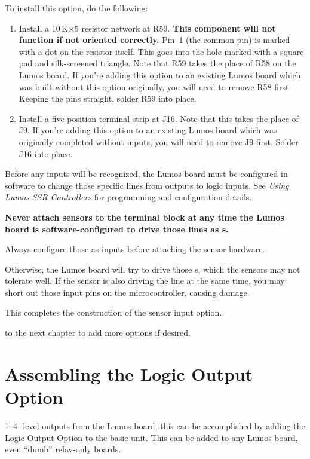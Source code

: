 \documentclass[letterpaper,twoside,onecolumn,openright,final]{memoir}
\begin{document}
To install this option, do the following:
\begin{enumerate}
\item	Install a 10\,K$\times$5 resistor network at R59.  {\bfseries This component will not
	function if not oriented correctly.} Pin~1 (the common pin) is marked with a dot on the 
	resistor itself.  This goes into the hole marked with a square pad and silk-screened 
	triangle.  Note that R59 takes the place of R58 on the Lumos board.  If you're adding this
	option to an existing Lumos board which was built without this option originally, you 
	will need to remove R58 first.  Keeping the pins straight, solder R59 into place.
\item	Install a five-position terminal strip at J16.  Note that this takes the place of J9.
	If you're adding this option to an existing Lumos board which was originally completed
	without inputs, you will need to remove J9 first.  Solder J16 into place.
\end{enumerate}

\begin{description}
\item[\HandRight\ Note:] Before any inputs will be recognized, the Lumos board must be configured
in software to change those specific lines from  outputs to logic inputs.  See
\emph{Using Lumos SSR Controllers} for programming and configuration details.
{\bfseries Never attach sensors to the terminal block at any time the Lumos board is software-configured
to drive those lines as s.  
\item[\HandRight\ Note:] Always configure those as inputs before attaching the
sensor hardware.} Otherwise, the Lumos board will try to drive those s, which the
sensors may not tolerate well. If the sensor is also driving the line at the same time, you may
short out those input pins on the microcontroller, causing damage.
\end{description}

This completes the construction of the sensor input option.

\bigskip{} to the next chapter to add more options if desired.

\chapter{Assembling the Logic Output Option}\label{ch:logic-out}
 1--4 -level outputs from the Lumos board,
this can be accomplished by adding the Logic Output Option to the basic unit.  This can be
added to any Lumos board, even ``dumb'' relay-only boards.  
\end{document}
